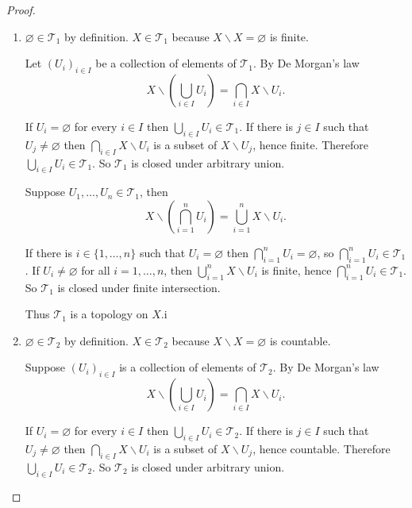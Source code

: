 \begin{proof}
	\begin{enumerate}[label={(\alph*)}]
		\item $\varnothing\in\mathscr{T}_{1}$ by definition. $X\in\mathscr{T}_{1}$ because $X\smallsetminus X = \varnothing$ is finite.

		      Let ${(U_{i})}_{i\in I}$ be a collection of elements of $\mathscr{T}_{1}$. By De Morgan's law
		      \[
			      X\smallsetminus \left(\bigcup_{i\in I} U_{i}\right) = \bigcap_{i\in I} X\smallsetminus U_{i}.
		      \]

		      If $U_{i} = \varnothing$ for every $i\in I$ then $\bigcup_{i\in I} U_{i}\in\mathscr{T}_{1}$. If there is $j\in I$ such that $U_{j}\ne\varnothing$ then $\bigcap_{i\in I} X\smallsetminus U_{i}$ is a subset of $X\smallsetminus U_{j}$, hence finite. Therefore $\bigcup_{i\in I} U_{i}\in\mathscr{T}_{1}$. So $\mathscr{T}_{1}$ is closed under arbitrary union.

		      Suppose $U_{1}, \ldots, U_{n}\in\mathscr{T}_{1}$, then
		      \[
			      X\smallsetminus \left(\bigcap^{n}_{i=1}U_{i}\right) = \bigcup^{n}_{i=1}X\smallsetminus U_{i}.
		      \]

		      If there is $i \in \{1,\ldots,n\}$ such that $U_{i} = \varnothing$ then $\bigcap^{n}_{i=1}U_{i} = \varnothing$, so $\bigcap^{n}_{i=1}U_{i}\in\mathscr{T}_{1}$.  If $U_{i}\ne\varnothing$ for all $i=1,\ldots,n$, then $\bigcup^{n}_{i=1}X\smallsetminus U_{i}$ is finite, hence $\bigcap^{n}_{i=1}U_{i}\in\mathscr{T}_{1}$. So $\mathscr{T}_{1}$ is closed under finite intersection.

		      Thus $\mathscr{T}_{1}$ is a topology on $X$.i
		\item $\varnothing\in\mathscr{T}_{2}$ by definition. $X\in\mathscr{T}_{2}$ because $X\smallsetminus X = \varnothing$ is countable.

		      Suppose ${(U_{i})}_{i\in I}$ is a collection of elements of $\mathscr{T}_{2}$. By De Morgan's law
		      \[
			      X\smallsetminus \left(\bigcup_{i\in I} U_{i}\right) = \bigcap_{i\in I} X\smallsetminus U_{i}.
		      \]

		      If $U_{i} = \varnothing$ for every $i\in I$ then $\bigcup_{i\in I} U_{i}\in\mathscr{T}_{2}$. If there is $j\in I$ such that $U_{j}\ne\varnothing$ then $\bigcap_{i\in I} X\smallsetminus U_{i}$ is a subset of $X\smallsetminus U_{j}$, hence countable. Therefore $\bigcup_{i\in I} U_{i}\in\mathscr{T}_{2}$. So $\mathscr{T}_{2}$ is closed under arbitrary union.


\end{enumerate}
\end{proof}
